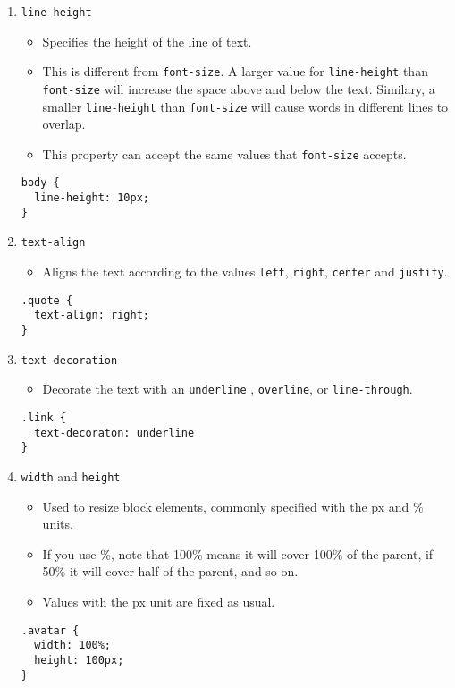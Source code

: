 \documentclass[12pt]{article}
\begin{document}
\begin{enumerate}
\item{\texttt{line-height}}
\begin{itemize}
    \item Specifies the height of the line of text.  
    \item This is different from \texttt{font-size}.  A larger value for \texttt{line-height} than \texttt{font-size} will increase the space above and below the text.  Similary, a smaller \texttt{line-height} than \texttt{font-size} will cause words in different lines to overlap.  
    \item This property can accept the same values that \texttt{font-size} accepts.
\end{itemize}    
\begin{lstlisting}[frame=single]
body {
  line-height: 10px;
}

\end{lstlisting}
    
\item{\texttt{text-align}}
\begin{itemize}
    \item Aligns the text according to the values \texttt{left}, \texttt{right}, \texttt{center} and \texttt{justify}.
\end{itemize}    
\begin{lstlisting}[frame=single]
.quote {
  text-align: right;
}
\end{lstlisting}
    
\item{\texttt{text-decoration}}
\begin{itemize}
    \item Decorate the text with an  \texttt{underline} ,  \texttt{overline}, or  \texttt{line-through}.
\end{itemize}    
\begin{lstlisting}[frame=single]
.link {
  text-decoraton: underline
}
\end{lstlisting}
    

\item{\texttt{width} and \texttt{height}}
\begin{itemize}
    \item Used to resize block elements, commonly specified with the px and \% units.  
    \item If you use \%, note that 100\% means it will cover 100\% of the parent, if 50\% it will cover half of the parent, and so on.  
    \item Values with the px unit are fixed as usual.
\end{itemize}    
\begin{lstlisting}[frame=single]
.avatar {
  width: 100%;
  height: 100px;
}
\end{lstlisting}
    

\end{enumerate}
\end{document}
